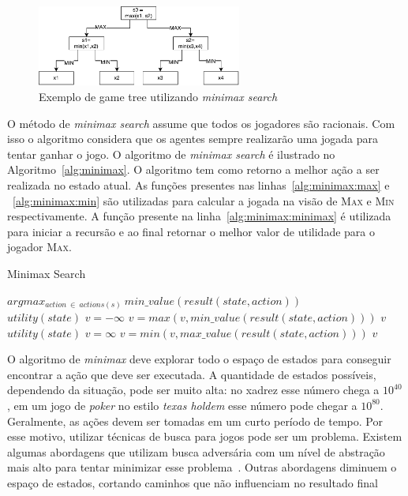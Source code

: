 \begin{figure}[ht]
	\centering
	\includegraphics[width=0.6\textwidth]{fig/gametree.pdf}
	\caption{Exemplo de game tree utilizando \textit{minimax search}}
	\label{fig:gametree}
\end{figure} 

O método de \textit{minimax search} assume que todos os jogadores são racionais.
Com isso o algoritmo considera que os agentes sempre realizarão uma jogada para tentar ganhar o jogo.
O algoritmo de \textit{minimax search} é ilustrado no Algoritmo~\ref{alg:minimax}. 
O algoritmo tem como retorno a melhor ação a ser realizada no estado atual. 
As funções presentes nas linhas~\ref{alg:minimax:max} e ~\ref{alg:minimax:min} são utilizadas para calcular a jogada na visão de \textsc{Max} e \textsc{Min} respectivamente.
A função presente na linha~\ref{alg:minimax:minimax} é utilizada para iniciar a recursão e ao final retornar o melhor valor de utilidade para o jogador \textsc{Max}.

\begin{algorithm}
	\caption{Minimax Search}
	\label{alg:minimax}
	\begin{algorithmic}[1]	
		 \label{alg:minimax:minimax}
		\State \Return $arg max_{action~ \in~ actions(s)}~ min\_value(result(state,  action)) $
		\EndFunction \\
		\label{alg:minimax:max}
		\State	\Return $utility(state)$
		\EndIf
		\State $v = -\infty$
		\State $v = max(v, min\_value(result(state,action)))$
		\EndFor	
		\State	\Return $v$
		\EndFunction \\
		\label{alg:minimax:min}
		\State	\Return $utility(state)$
		\EndIf
		\State $v = \infty$
		\State $v = min(v, max\_value(result(state,action)))$
		\EndFor	
		\State	\Return $v$
		\EndFunction
	\end{algorithmic}
\end{algorithm}


O algoritmo de \textit{minimax} deve explorar todo o espaço de estados para conseguir encontrar a ação que deve ser executada. 
A quantidade de estados possíveis, dependendo da situação, pode ser muito alta: no xadrez esse número chega a $10^{40}$, em um jogo de \textit{poker} no estilo \textit{texas holdem} esse número pode chegar a $10^{80}$. 
Geralmente, as ações devem ser tomadas em um curto período de tempo. 
Por esse motivo, utilizar técnicas de busca para jogos pode ser um problema. 
Existem algumas abordagens que utilizam busca adversária com um nível de abstração mais alto para tentar minimizar esse problema~\cite{ontanon2013survey}. Outras abordagens diminuem o espaço de estados, cortando caminhos que não influenciam no resultado final~\cite[Capítulo 5]{intelligence2003modern}
